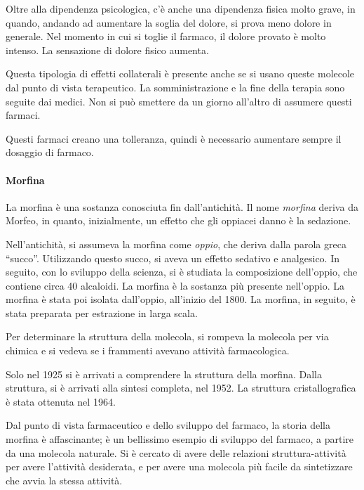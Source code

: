 Oltre alla dipendenza psicologica, c'è anche una dipendenza fisica molto
grave, in quando, andando ad aumentare la soglia del dolore, si prova
meno dolore in generale. Nel momento in cui si toglie il farmaco, il
dolore provato è molto intenso. La sensazione di dolore fisico aumenta.

Questa tipologia di effetti collaterali è presente anche se si usano
queste molecole dal punto di vista terapeutico. La somministrazione e la
fine della terapia sono seguite dai medici. Non si può smettere da un
giorno all'altro di assumere questi farmaci.

Questi farmaci creano una tolleranza, quindi è necessario aumentare
sempre il dosaggio di farmaco.

\paragraph{Morfina}

La morfina è una sostanza conosciuta fin dall'antichità. Il nome
\emph{morfina} deriva da Morfeo, in quanto, inizialmente, un effetto che
gli oppiacei danno è la sedazione.


Nell'antichità, si assumeva la morfina come \emph{oppio}, che deriva
dalla parola greca ``succo''. Utilizzando questo succo, si aveva un
effetto sedativo e analgesico. In seguito, con lo sviluppo della
scienza, si è studiata la composizione dell'oppio, che contiene circa 40
alcaloidi. La morfina è la sostanza più presente nell'oppio. La morfina
è stata poi isolata dall'oppio, all'inizio del
1800.
La morfina, in seguito, è stata preparata per estrazione in larga scala.

Per determinare la struttura della molecola, si rompeva la molecola per
via chimica e si vedeva se i frammenti avevano attività farmacologica.

Solo nel 1925 si è arrivati a comprendere la struttura della morfina.
Dalla struttura, si è arrivati alla sintesi completa, nel 1952. La
struttura cristallografica è stata ottenuta nel 1964.

Dal punto di vista farmaceutico e dello sviluppo del farmaco, la storia
della morfina è affascinante; è un bellissimo esempio di sviluppo del
farmaco, a partire da una molecola naturale. Si è cercato di avere delle
relazioni struttura-attività per avere l'attività desiderata, e per
avere una molecola più facile da sintetizzare che avvia la stessa
attività.

